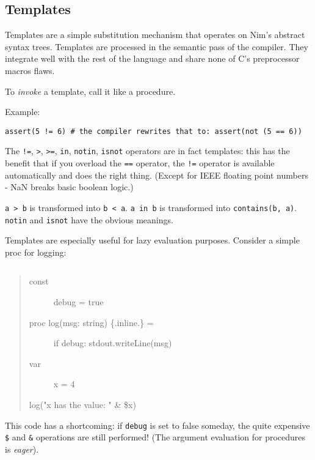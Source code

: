 \hypertarget{templates}{%
\subsection{Templates}\label{templates}}

Templates are a simple substitution mechanism that operates on Nim's
abstract syntax trees. Templates are processed in the semantic pass of
the compiler. They integrate well with the rest of the language and
share none of C's preprocessor macros flaws.

To \emph{invoke} a template, call it like a procedure.

Example:

\begin{verbatim}
assert(5 != 6) # the compiler rewrites that to: assert(not (5 == 6))
\end{verbatim}

The \texttt{!=}, \texttt{\textgreater{}}, \texttt{\textgreater{}=},
\texttt{in}, \texttt{notin}, \texttt{isnot} operators are in fact
templates: this has the benefit that if you overload the \texttt{==}
operator, the \texttt{!=} operator is available automatically and does
the right thing. (Except for IEEE floating point numbers - NaN breaks
basic boolean logic.)

\texttt{a\ \textgreater{}\ b} is transformed into
\texttt{b\ \textless{}\ a}. \texttt{a\ in\ b} is transformed into
\texttt{contains(b,\ a)}. \texttt{notin} and \texttt{isnot} have the
obvious meanings.

Templates are especially useful for lazy evaluation purposes. Consider a
simple proc for logging:

\begin{verbatim}
\end{verbatim}

\begin{quote}
\begin{description}
\item[const]
debug = true
\item[proc log(msg: string) \{.inline.\} =]
if debug: stdout.writeLine(msg)
\item[var]
x = 4
\end{description}

log("x has the value: " \& \$x)
\end{quote}

This code has a shortcoming: if \texttt{debug} is set to false someday,
the quite expensive \texttt{\$} and \texttt{\&} operations are still
performed! (The argument evaluation for procedures is \emph{eager}).

